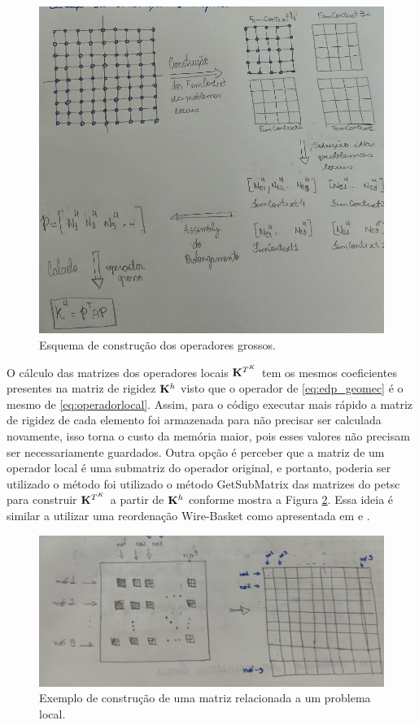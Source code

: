 \begin{figure}[!htbp]
\centering
\includegraphics[width=\textwidth]{chap07/figs/esquemaprolongamento.png}
\caption{Esquema de construção dos operadores grossos.}
\label{fig:esquemaconstrucao}
\end{figure}


O cálculo das matrizes dos operadores locais $\mathbf{K}^{T^K}$ tem os mesmos coeficientes presentes na matriz de rigidez $\mathbf{K}^h$ visto que o operador de \eqref{eq:edp_geomec} é o mesmo de \eqref{eq:operadorlocal}. Assim, para o código executar mais rápido a matriz de rigidez de cada elemento foi armazenada para não precisar ser calculada novamente, isso torna o custo da memória maior, pois esses valores não precisam ser necessariamente guardados. Outra opção é perceber que a matriz de um operador local é uma submatriz do operador original, e portanto, poderia ser utilizado o método foi utilizado o método GetSubMatrix das matrizes do petsc para construir $\mathbf{K}^{T^K}$ a partir de $\mathbf{K}^h$ conforme mostra a Figura \ref{fig:submatrix}. Essa ideia é similar a utilizar uma reordenação Wire-Basket como apresentada em \cite{casteletto} e \cite{irina}.

\begin{figure}[!htbp]
\centering
\includegraphics[width=\textwidth]{chap07/figs/submatrix.png}
\caption{Exemplo de construção de uma matriz relacionada a um problema local.}
\label{fig:submatrix}
\end{figure}


